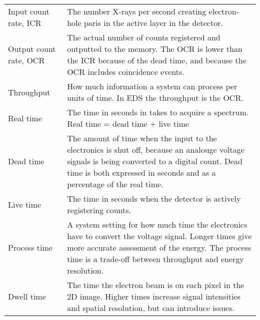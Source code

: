 \begin{table}[pht]
\begin{center}
\begin{tabular}{p{2.6cm}p{12cm}}
            Input count rate, ICR             & The number X-rays per second creating electron-hole paris in the active layer in the detector.                                                                                                                             \\
            Output count rate, OCR            & The actual number of counts registered and outputted to the memory. The OCR is lower than the ICR because of the dead time, and because the OCR includes coincidence events.                                               \\
            Throughput                        & How much information a system can process per units of time. In EDS the throughput is the OCR.                                                                                                                             \\
            Real time                         & The time in seconds in takes to acquire a spectrum. Real time = dead time + live time                                                                                                                                      \\
            Dead time                         & The amount of time when the input to the electronics is shut off, because an analouge voltage signals is being converted to a digital count. Dead time is both expressed in seconds and as a percentage of the real time.  \\
            Live time                         & The time in seconds when the detector is actively registering counts.                                                                                                                                                      \\
            Process time                      & A system setting for how much time the electronics have to convert the voltage signal. Longer times give more accurate assessment of the energy. The process time is a trade-off between throughput and energy resolution. \\
            Dwell time                        & The time the electron beam is on each pixel in the 2D image. Higher times increase signal intensities and spatial resolution, but can introduce issues.                                                                    \\
            \hline
        \end{tabular}
    \end{center}
\end{table}